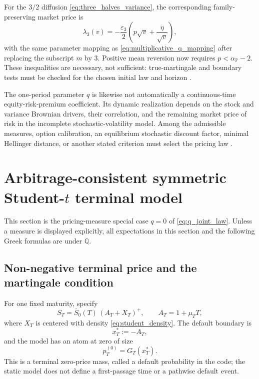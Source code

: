 \documentclass[11pt,a4paper]{article}
\newcommand{\cdf}{G}
\begin{document}
For the $3/2$ diffusion \eqref{eq:three_halves_variance}, the corresponding
family-preserving market price is
\begin{equation}
  \lambda_3(v)
  =-\frac{\varepsilon_3}{2}
    \left(p\sqrt v+\frac{\eta}{\sqrt v}\right),
  \label{eq:three_halves_girsanov_kernel}
\end{equation}
with the same parameter mapping as
\eqref{eq:multiplicative_q_mapping} after replacing the subscript $m$ by
$3$.  Positive mean reversion now requires
$p<\alpha_{\mathbb P}-2$.  These inequalities are necessary, not sufficient:
true-martingale and boundary tests must be checked for the chosen initial law
and horizon \cite{DesmettreLeobacherRogers2021}.

The one-period parameter $q$ is likewise not automatically a
continuous-time equity-risk-premium coefficient.  Its dynamic realization
depends on the stock and variance Brownian drivers, their correlation, and
the remaining market price of risk in the incomplete stochastic-volatility
model.  Among the admissible measures, option calibration, an equilibrium
stochastic discount factor, minimal Hellinger distance, or another stated
criterion must select the pricing law
\cite{ChoulliStrickerLi2007,JeanblancKloppelMiyahara2007}.

\section{Arbitrage-consistent symmetric Student-\texorpdfstring{$t$}{t}
terminal model}

This section is the pricing-measure special case $q=0$ of
\eqref{eq:q_joint_law}.  Unless a measure is displayed explicitly, all
expectations in this section and the following Greek formulas are under
$\mathbb Q$.

\subsection{Non-negative terminal price and the martingale condition}

For one fixed maturity, specify
\begin{equation}
  S_T=\bar S_0(T)\,(A_T+X_T)^+,
  \qquad A_T=1+\mu_TT,
  \label{eq:terminal_asset}
\end{equation}
where $X_T$ is centered with density \eqref{eq:student_density}.  The default
boundary is
\begin{equation}
  x_T^*:=-A_T,
  \label{eq:default_boundary}
\end{equation}
and the model has an atom at zero of size
\begin{equation}
  p_T^{(0)}=\cdf_T(x_T^*).
  \label{eq:default_probability}
\end{equation}
This is a terminal zero-price mass, called a default probability in the code;
the static model does not define a first-passage time or a pathwise default
event.
\end{document}
